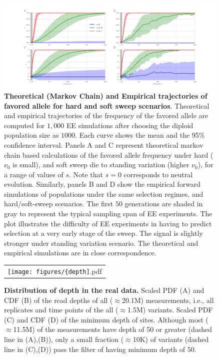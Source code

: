 \documentclass[11pt]{article}
\begin{document}
\begin{figure}[H]
	\includegraphics[trim=1in 0.1in 1in 
	0.1in,clip,width=\textwidth]{figures/AF.pdf}
	\caption{{\bf Theoretical (Markov Chain) and Empirical
            trajectories of favored allele for hard and soft sweep
            scenarios}.  Theoretical and empirical trajectories of the
          frequency of the favored allele are computed for $1,000$ EE
          simulations after choosing the diploid population size as
          $1000$. Each curve shows the mean and the 95\% confidence
          interval.  Panels A and C represent theoretical markov chain
          based calculations of the favored allele frequency under
          hard ($\nu_0$ is small), and soft sweep die to standing
          variation (higher $\nu_0$), for a range of values of
          $s$. Note that $s=0$ corresponds to neutral
          evolution. Similarly, panels B and D show the empirical
          forward simulations of populations under the same selection
          regimes, and hard/soft-sweep scenarios. The first $50$
          generations are shaded in gray to represent the typical
          sampling span of EE experiments. The plot illustrates the
          difficulty of EE experiments in having to predict selection
          at a very early stage of the sweep. The signal is slightly
          stronger under standing variation scenario. The theoretical
          and empirical simulations are in close correspondence. }
	\label{fig:sweep}
\end{figure}

\begin{figure}[H]
	\centering
	\begin{tabular}{c}
		\texttt{[image: figures/\{depth]}.pdf}
	\end{tabular}
	\caption{ {\bf Distribution of depth in the real data.}
		 Scaled PDF (A) and CDF (B) of the read depths of all ($\approx$20.1M) 
		 measurements, i.e., all replicates and time points of the all 
		 ($\approx$1.5M) variants.
		 Scaled PDF (C) and CDF (D) of the minimum depth of sites. Although 
		 most ($\approx$11.5M) of the measurements have depth of 50 or greater 
		 (dashed line in (A),(B)), only a small fraction ($\approx$10K) of 
		 variants (dashed line in (C),(D)) pass the filter of having minimum 
		 depth of 50.}  
	\label{fig:depth}
\end{figure}
\end{document}
